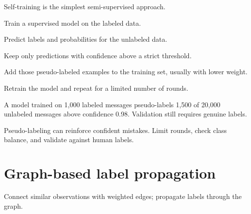 Self-training is the simplest semi-supervised approach.

\begin{mlsteps}
  \item Train a supervised model on the labeled data.
  \item Predict labels and probabilities for the unlabeled data.
  \item Keep only predictions with confidence above a strict threshold.
  \item Add those pseudo-labeled examples to the training set, usually with lower weight.
  \item Retrain the model and repeat for a limited number of rounds.
\end{mlsteps}

\begin{workedexample}
A model trained on 1,000 labeled messages pseudo-labels 1,500 of 20,000 unlabeled messages above confidence 0.98. Validation still requires genuine labels.
\end{workedexample}

\begin{pitfall}
Pseudo-labeling can reinforce confident mistakes. Limit rounds, check class balance, and validate against human labels.
\end{pitfall}

\section{Graph-based label propagation}

Connect similar observations with weighted edges; propagate labels through the graph.

\begin{mlfigure}
\end{mlfigure}


